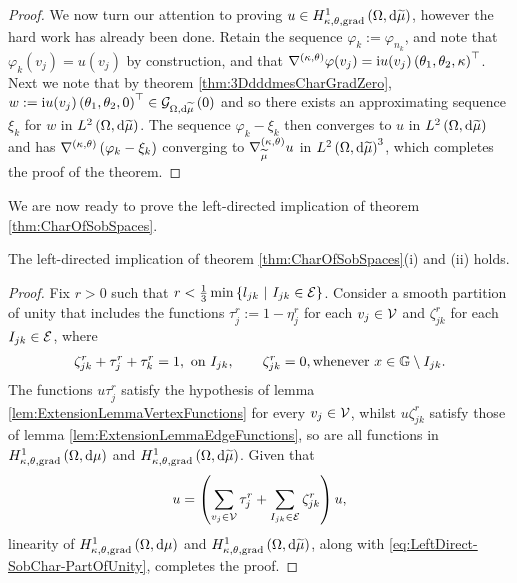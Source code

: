 \begin{proof}
	We now turn our attention to proving $u\in H^1_{\kappa,\theta,\mathrm{grad}}\left( \Omega, \mathrm{d}\widetilde{\mu} \right)$, however the hard work has already been done.
	Retain the sequence $\varphi_k := \varphi_{n_k}$, and note that $\varphi_k(v_j) = u(v_j)$ by construction, and that $\nabla^{\left( \kappa, \theta \right)}\varphi(v_j) = \mathrm{i} u(v_j)\left( \theta_1,\theta_2,\kappa \right)^\top$.
	Next we note that by theorem \ref{thm:3DdddmesCharGradZero}, $w := \mathrm{i} u(v_j)\left( \theta_1,\theta_2,0 \right)^\top\in\mathcal{G}_{ \Omega, \mathrm{d}\widetilde{\mu}}\left( 0 \right)$ and so there exists an approximating sequence $\xi_k$ for $w$ in $L^{2}\left( \Omega,\mathrm{d} \widetilde{\mu} \right)$.
	The sequence $\varphi_k - \xi_k$ then converges to $u$ in $L^{2}\left( \Omega,\mathrm{d} \widetilde{\mu} \right)$ and has $\nabla^{\left( \kappa, \theta \right)}\left( \varphi_k - \xi_k \right)$ converging to $\nabla^{\left( \kappa, \theta \right)}_{\widetilde{\mu}}u$ in $L^{2}\left( \Omega,\mathrm{d} \widetilde{\mu} \right)^3$, which completes the proof of the theorem.
\end{proof}

We are now ready to prove the left-directed implication of theorem \ref{thm:CharOfSobSpaces}.
\begin{theorem} \label{thm:LeftDirect-SobChar}
	The left-directed implication of theorem \ref{thm:CharOfSobSpaces}(i) and (ii) holds.
\end{theorem}
\begin{proof}
	Fix $r>0$ such that $r<\frac{1}{3}\min\left\{ l_{jk} \ \middle\vert \  I_{jk}\in\mathcal{E} \right\}$.
	Consider a smooth partition of unity that includes the functions $\tau_j^r := 1-\eta_j^r$ for each $v_j\in\mathcal{V}$ and $\zeta_{jk}^r$ for each $I_{jk}\in\mathcal{E}$, where
	\begin{align} \label{eq:LeftDirect-SobChar-PartOfUnity}
		\zeta_{jk}^r + \tau_j^r + \tau_k^r = 1, \text{ on } I_{jk}, 
		\qquad
		\zeta_{jk}^r = 0, \text{whenever } x\in\mathbb{G}\setminus I_{jk}.
	\end{align}
	The functions $u\tau_j^r$ satisfy the hypothesis of lemma \ref{lem:ExtensionLemmaVertexFunctions} for every $v_j\in\mathcal{V}$, whilst $u\zeta_{jk}^r$ satisfy those of lemma \ref{lem:ExtensionLemmaEdgeFunctions}, so are all functions in $H^1_{\kappa,\theta,\mathrm{grad}}\left( \Omega, \mathrm{d}\mu \right)$ and $H^1_{\kappa,\theta,\mathrm{grad}}\left( \Omega, \mathrm{d}\widetilde{\mu} \right)$.
	Given that
	\begin{align*}
		u = \left(  \sum_{v_j\in\mathcal{V}} \tau_j^r + \sum_{I_{jk}\in\mathcal{E}} \zeta_{jk}^r  \right)u,
	\end{align*}
	linearity of $H^1_{\kappa,\theta,\mathrm{grad}}\left( \Omega, \mathrm{d}\mu \right)$ and $H^1_{\kappa,\theta,\mathrm{grad}}\left( \Omega, \mathrm{d}\widetilde{\mu} \right)$, along with \eqref{eq:LeftDirect-SobChar-PartOfUnity}, completes the proof.
\end{proof}